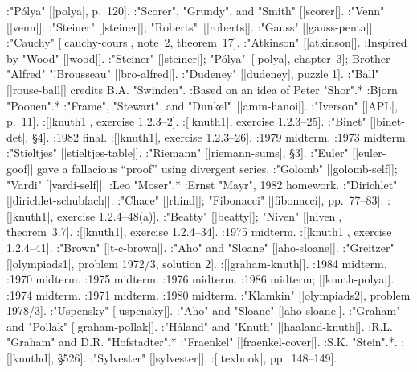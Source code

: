 :"P\'olya" [|polya|, p.~120].
:"Scorer", "Grundy", and "Smith" [|scorer|].
:"Venn" [|venn|].
:"Steiner" [|steiner|]; "Roberts"~[|roberts|].
:"Gauss" [|gauss-penta|].
:"Cauchy" [|cauchy-cours|, note~2, theorem~17].
:"Atkinson" [|atkinson|].
:Inspired by "Wood" [|wood|].
:"Steiner" [|steiner|]; "P\'olya"~[|polya|, chapter~3]; Brother "Alfred" "!Brousseau" [|bro-alfred|].
:"Dudeney" [|dudeney|, puzzle 1].
:"Ball" [|rouse-ball|] credits B.\thinspace A. "Swinden".
:Based on an idea of Peter "Shor".*
:Bjorn "Poonen".*
:"Frame", "Stewart", and "Dunkel"~[|amm-hanoi|].
:"Iverson" [|APL|, p.~11].
:[|knuth1|, exercise 1.2.3--2].
:[|knuth1|, exercise 1.2.3--25].
:"Binet" [|binet-det|, \S 4].
:1982 final.
:[|knuth1|, exercise 1.2.3--26].
:1979 midterm.
:1973 midterm.
:"Stieltjes" [|stieltjes-table|].
:"Riemann" [|riemann-sums|, \S 3].
:"Euler" [|euler-goof|] gave a fallacious ``proof'' using divergent series.
:"Golomb" [|golomb-self|]; "Vardi" [|vardi-self|].
:Leo "Moser".*
:Ernst "Mayr", 1982 homework.
:"Dirichlet" [|dirichlet-schubfach|].
:"Chace" [|rhind|]; "Fibonacci" [|fibonacci|, pp.~77--83].
:[|knuth1|, exercise 1.2.4--48(a)].
:"Beatty" [|beatty|]; "Niven" [|niven|, theorem~3.7].
:[|knuth1|, exercise 1.2.4--34].
:1975 midterm.
:[|knuth1|, exercise 1.2.4--41].
:"Brown" [|t-c-brown|].
:"Aho" and "Sloane" [|aho-sloane|].
:"Greitzer" [|olympiads1|, problem 1972/3, solution 2].
:[|graham-knuth|].
:1984 midterm.
:1970 midterm.
:1975 midterm.
:1976 midterm.
:1986 midterm; [|knuth-polya|].
:1974 midterm.
:1971 midterm.
:1980 midterm.
:"Klamkin" [|olympiads2|, problem 1978/3].
:"Uspensky" [|uspensky|].
:"Aho" and "Sloane" [|aho-sloane|].
:"Graham" and "Pollak" [|graham-pollak|].
:"H{\aa }land" and "Knuth" [|haaland-knuth|].
:R.\thinspace L. "Graham" and D.\thinspace R. "Hofstadter".*
:"Fraenkel" [|fraenkel-cover|].
:S.\thinspace K. "Stein".*.
:[|knuthd|, \S 526].
:"Sylvester" [|sylvester|].
:[|texbook|, pp.~148--149].
